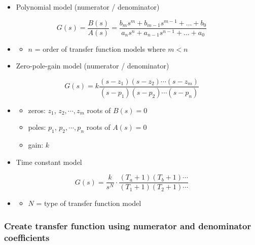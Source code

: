 \documentclass[12pt,letter]{article}
\numberwithin{ex}{section} %
\numberwithin{re}{section} %
\numberwithin{equation}{section}	%
\begin{document}
\begin{itemize}[noitemsep,topsep=0pt]
	\item Polynomial model (numerator / denominator)
\end{itemize}
\begin{equation}
	G(s) = \frac{B(s)}{A(s)} = \frac{b_ms^m + b_{m-1}s^{m-1} + ... + b_0}{a_ns^n + a_{n-1}s^{n-1} + ... + a_0}
\end{equation}
\begin{itemize}[noitemsep,topsep=0pt]
\item[]
	\begin{itemize}[noitemsep,topsep=0pt]
		\item $n$ = order of transfer function models where $m <n$
	\end{itemize}
	\item Zero-pole-gain model (numerator / denominator)
\end{itemize}
\begin{equation}
	G(s) = k \frac{(s-z_1)(s-z_2)\cdots (s-z_m)}{(s-p_1)(s-p_2)\cdots (s-p_n)}
\end{equation}
\begin{itemize}[noitemsep,topsep=0pt]
\item[]
\begin{itemize}[noitemsep,topsep=0pt]
	\item zeros: $z_1$, $z_2, \cdots, z_m$ roots of $B(s)=0$ 
	\item poles: $p_1$, $p_2, \cdots, p_n$ roots of $A(s)=0$ 
	\item gain: $k$
\end{itemize}
\item Time constant model
\end{itemize}
 \begin{equation}
G(s) = \frac{k}{s^N} \cdot \frac{(T_a + 1)(T_b + 1)\cdots}{(T_1 + 1)(T_2 + 1)\cdots}
\end{equation}
\begin{itemize}[noitemsep,topsep=0pt]
\item[] \begin{itemize}[noitemsep,topsep=0pt]
\item $N$ = type of transfer function model
\end{itemize}
\end{itemize}

\subsubsection{Create transfer function using numerator and denominator coefficients}
\end{document}

